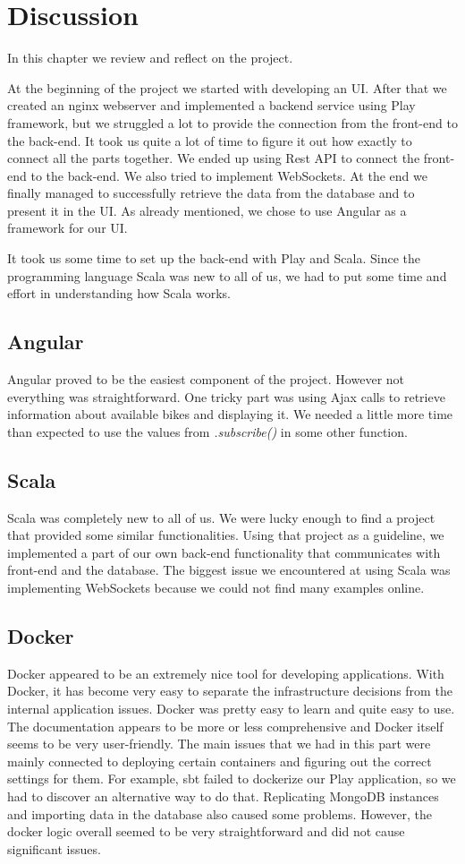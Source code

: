 \section{Discussion}

In this chapter we review and reflect on the project.

At the beginning of the project we started with developing an UI. After that we created an nginx webserver and implemented a backend service using Play framework, but we struggled a lot to provide the connection from the front-end to the back-end. It took us quite a lot of time to figure it out how exactly to connect all the parts together. We ended up using Rest API  to connect the front-end to the back-end. We also tried to implement WebSockets. At the end we finally managed to successfully retrieve the data from the database and to present it in the UI. As already mentioned, we chose to use Angular as a framework for our UI.

It took us some time to set up the back-end with Play and Scala. Since the programming language Scala was new to all of us, we had to put some time and effort in understanding how Scala works.

\subsection{Angular}
Angular proved to be the easiest component of the project.  However not everything was straightforward. One tricky part was using Ajax calls to retrieve information about available bikes and displaying it. We needed a little more time than expected to use the values from \textit{.subscribe()} in some other function.
\subsection{Scala}
Scala was completely new to all of us. We were lucky enough to find a project that provided some similar functionalities. Using that project as a guideline, we implemented a part of our own back-end functionality that communicates with front-end and the database. The biggest issue we encountered at using Scala was implementing WebSockets because we could not find many examples online.
\subsection{Docker}
Docker appeared to be an extremely nice tool for developing applications. With Docker, it has become very easy to separate the infrastructure decisions from the internal application issues. Docker was pretty easy to learn and quite easy to use. The documentation appears to be more or less comprehensive and Docker itself seems to be very user-friendly. The main issues that we had in this part were mainly connected to deploying certain containers and figuring out the correct settings for them. For example, sbt failed to dockerize our Play application, so we had to discover an alternative way to do that. Replicating MongoDB instances and importing data in the database also caused some problems. However, the docker logic overall seemed to be very straightforward and did not cause significant issues.

